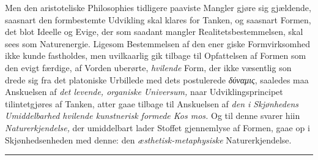 \documentclass[12pt,a4paper]{book}
\newcommand{\divrule}{\begin{center}\rule{2cm}{0.4pt}\end{center}}
\newcommand{\dblrule}{\begin{center}%
  \rule{2cm}{0.4pt}\\[1.2pt]\rule{2cm}{0.4pt}\end{center}}
\newcommand{\gk}[1]{\textit{#1}}
\begin{document}
Men den aristoteliske Philosophies tidligere paaviste Mangler
gjøre sig gjældende, saasnart den formbestemte Udvikling skal
klares for Tanken, og saasnart Formen, det blot Ideelle og
Evige, der som saadant mangler Realitetsbestemmelsen, skal
sees som Naturenergie. Ligesom Bestemmelsen af den ener\-%
giske Formvirksomhed ikke kunde fastholdes, men uvilkaarlig
gik tilbage til Opfattelsen af Formen som den evigt færdige,
af Vorden uberørte, \emph{hvilende} Form, der ikke væsentlig son\-%
drede sig fra det platoniske Urbillede med dets postulerede
\gk{δύναμις}, saaledes maa Anskuelsen af \emph{det levende, organiske
Universum,} naar Udviklingsprincipet tilintetgjøres af Tanken,
atter gaae tilbage til Anskuelsen af \emph{den i Skjønhedens
Umiddelbarhed hvilende kunstnerisk formede Kos\-%
mos.} Og til denne svarer hiin \emph{Naturerkjendelse,} der
umiddelbart lader Stoffet gjennemlyse af Formen, gaae op i
Skjønhedsenheden med denne: den \emph{æsthetisk-metaphysiske}
Naturerkjendelse.
\divrule
\end{document}
